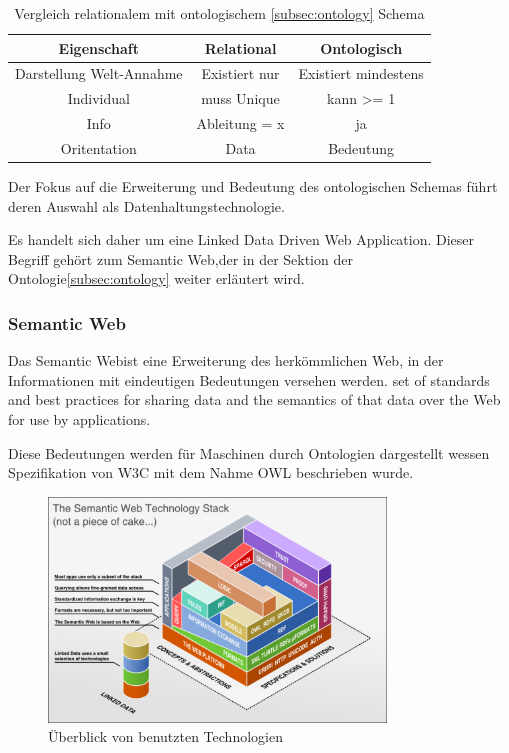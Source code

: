 \documentclass[
12pt,
english,
ngerman,
headsepline,
twoside,
openright,
numbers=noenddot,version=first
]{scrreprt}
\providecommand{\tabularnewline}{\\}
\begin{document}
\begin{table}[h]
	\caption{Vergleich relationalem mit ontologischem \ref{subsec:ontology} Schema}
	
	\centering{}
	\begin{tabular}{ccc}
		\noalign{\vskip\doublerulesep}
		Eigenschaft & Relational & Ontologisch \tabularnewline[\doublerulesep]
		\hline\noalign{\vskip\doublerulesep}
		Darstellung Welt-Annahme & Existiert nur & Existiert mindestens \tabularnewline[\doublerulesep]
		\noalign{\vskip\doublerulesep}
		Individual & muss Unique & kann >= 1 \tabularnewline[\doublerulesep]
		\noalign{\vskip\doublerulesep}
		Info & Ableitung = x & ja \tabularnewline[\doublerulesep]
		\noalign{\vskip\doublerulesep}
		Oritentation & Data & Bedeutung \tabularnewline[\doublerulesep]
		
	\end{tabular}
\end{table}

Der Fokus auf die Erweiterung und Bedeutung des ontologischen Schemas führt deren Auswahl als Datenhaltungstechnologie. 

Es handelt sich daher um eine \glqq Linked Data Driven Web Application\grqq.%
Dieser Begriff gehört zum \glqq Semantic Web\grqq,der in der Sektion der Ontologie\ref{subsec:ontology} weiter erläutert wird.

\subsubsection{Semantic Web}

Das \glqq Semantic Web\grqq ist eine Erweiterung des herkömmlichen Web, in der Informationen mit eindeutigen Bedeutungen versehen werden\cite{ontoWhat2}.
set of standards and best practices for sharing data and the semantics of that data over the Web for use by applications\cite{sparqlLearn}.

Diese Bedeutungen werden für Maschinen durch Ontologien dargestellt wessen Spezifikation von W3C\cite{W3C} mit dem Nahme \acrfull{OWL} beschrieben wurde.

\begin{figure}[h]
	\centering
	\includegraphics[width=0.8\textwidth]{pics/semantic_web_technology_stack.eps}
	\caption{Überblick von benutzten Technologien}
	\label{fig:semantic-web-stack}
\end{figure}
\end{document}
